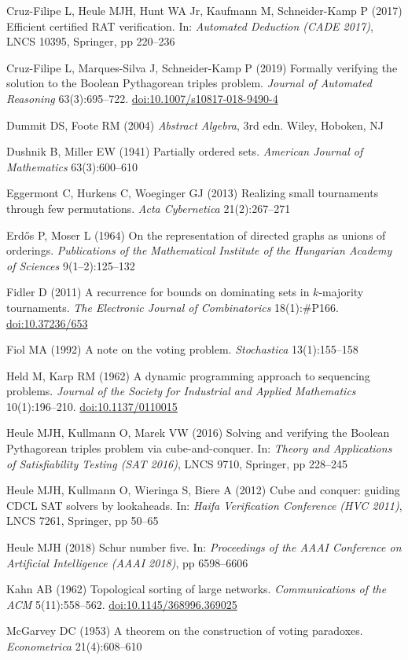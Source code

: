 \documentclass[
]{article}
\begin{document}
Cruz-Filipe L, Heule MJH, Hunt WA Jr, Kaufmann M, Schneider-Kamp P
(2017) Efficient certified RAT verification. In: \emph{Automated
Deduction (CADE 2017)}, LNCS 10395, Springer, pp 220--236

Cruz-Filipe L, Marques-Silva J, Schneider-Kamp P (2019) Formally
verifying the solution to the Boolean Pythagorean triples problem.
\emph{Journal of Automated Reasoning} 63(3):695--722.
\url{doi:10.1007/s10817-018-9490-4}

Dummit DS, Foote RM (2004) \emph{Abstract Algebra}, 3rd edn. Wiley,
Hoboken, NJ

Dushnik B, Miller EW (1941) Partially ordered sets. \emph{American
Journal of Mathematics} 63(3):600--610

Eggermont C, Hurkens C, Woeginger GJ (2013) Realizing small tournaments
through few permutations. \emph{Acta Cybernetica} 21(2):267--271

Erdős P, Moser L (1964) On the representation of directed graphs as
unions of orderings. \emph{Publications of the Mathematical Institute of
the Hungarian Academy of Sciences} 9(1--2):125--132

Fidler D (2011) A recurrence for bounds on dominating sets in
\(k\)-majority tournaments. \emph{The Electronic Journal of
Combinatorics} 18(1):\#P166. \url{doi:10.37236/653}

Fiol MA (1992) A note on the voting problem. \emph{Stochastica}
13(1):155--158

Held M, Karp RM (1962) A dynamic programming approach to sequencing
problems. \emph{Journal of the Society for Industrial and Applied
Mathematics} 10(1):196--210. \url{doi:10.1137/0110015}

Heule MJH, Kullmann O, Marek VW (2016) Solving and verifying the Boolean
Pythagorean triples problem via cube-and-conquer. In: \emph{Theory and
Applications of Satisfiability Testing (SAT 2016)}, LNCS 9710, Springer,
pp 228--245

Heule MJH, Kullmann O, Wieringa S, Biere A (2012) Cube and conquer:
guiding CDCL SAT solvers by lookaheads. In: \emph{Haifa Verification
Conference (HVC 2011)}, LNCS 7261, Springer, pp 50--65

Heule MJH (2018) Schur number five. In: \emph{Proceedings of the AAAI
Conference on Artificial Intelligence (AAAI 2018)}, pp 6598--6606

Kahn AB (1962) Topological sorting of large networks.
\emph{Communications of the ACM} 5(11):558--562.
\url{doi:10.1145/368996.369025}

McGarvey DC (1953) A theorem on the construction of voting paradoxes.
\emph{Econometrica} 21(4):608--610
\end{document}
